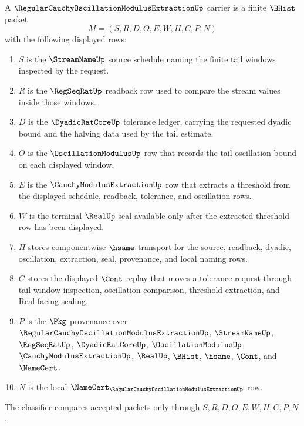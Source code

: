 \begin{definition}
\label{def:regular-cauchy-oscillation-modulus-extraction-carrier}
A $\RegularCauchyOscillationModulusExtractionUp$ carrier is a finite $\BHist$ packet
$$
M=(S,R,D,O,E,W,H,C,P,N)
$$
with the following displayed rows:
\begin{enumerate}
\item $S$ is the $\StreamNameUp$ source schedule naming the finite tail windows inspected by the request.
\item $R$ is the $\RegSeqRatUp$ readback row used to compare the stream values inside those windows.
\item $D$ is the $\DyadicRatCoreUp$ tolerance ledger, carrying the requested dyadic bound and the halving data used by the tail estimate.
\item $O$ is the $\OscillationModulusUp$ row that records the tail-oscillation bound on each displayed window.
\item $E$ is the $\CauchyModulusExtractionUp$ row that extracts a threshold from the displayed schedule, readback, tolerance, and oscillation rows.
\item $W$ is the terminal $\RealUp$ seal available only after the extracted threshold row has been displayed.
\item $H$ stores componentwise $\hsame$ transport for the source, readback, dyadic, oscillation, extraction, seal, provenance, and local naming rows.
\item $C$ stores the displayed $\Cont$ replay that moves a tolerance request through tail-window inspection, oscillation comparison, threshold extraction, and Real-facing sealing.
\item $P$ is the $\Pkg$ provenance over $\RegularCauchyOscillationModulusExtractionUp$, $\StreamNameUp$, $\RegSeqRatUp$, $\DyadicRatCoreUp$, $\OscillationModulusUp$, $\CauchyModulusExtractionUp$, $\RealUp$, $\BHist$, $\hsame$, $\Cont$, and $\NameCert$.
\item $N$ is the local $\NameCert_{\RegularCauchyOscillationModulusExtractionUp}$ row.
\end{enumerate}
The classifier compares accepted packets only through $S,R,D,O,E,W,H,C,P,N$.
\end{definition}

